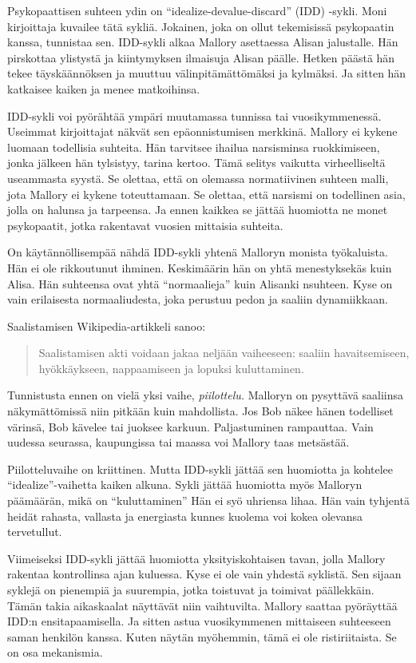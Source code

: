 Psykopaattisen suhteen ydin on ``idealize-devalue-discard'' (IDD) -sykli. Moni kirjoittaja kuvailee tätä sykliä. Jokainen, joka on ollut tekemisissä psykopaatin kanssa, tunnistaa sen. IDD-sykli alkaa Mallory asettaessa Alisan jalustalle. Hän pirskottaa ylistystä ja kiintymyksen ilmaisuja Alisan päälle. Hetken päästä hän tekee täyskäännöksen ja muuttuu välinpitämättömäksi ja kylmäksi. Ja sitten hän katkaisee kaiken ja menee matkoihinsa.

IDD-sykli voi pyörähtää ympäri muutamassa tunnissa tai vuosikymmenessä. Useimmat kirjoittajat näkvät sen epäonnistumisen merkkinä. Mallory ei kykene luomaan todellisia suhteita. Hän tarvitsee ihailua narsisminsa ruokkimiseen, jonka jälkeen hän tylsistyy, tarina kertoo. Tämä selitys vaikutta virheelliseltä useammasta syystä. Se olettaa, että on olemassa normatiivinen suhteen malli, jota Mallory ei kykene toteuttamaan. Se olettaa, että narsismi on todellinen asia, jolla on halunsa ja tarpeensa. Ja ennen kaikkea se jättää huomiotta ne monet psykopaatit, jotka rakentavat vuosien mittaisia suhteita.

On käytännöllisempää nähdä IDD-sykli yhtenä Malloryn monista työkaluista. Hän ei ole rikkoutunut ihminen. Keskimäärin hän on yhtä menestyksekäs kuin Alisa. Hän suhteensa ovat yhtä ``normaalieja'' kuin Alisanki nsuhteen. Kyse on vain erilaisesta normaaliudesta, joka perustuu pedon ja saaliin dynamiikkaan.

Saalistamisen Wikipedia-artikkeli sanoo:
\begin{quotation}
\noindent Saalistamisen akti voidaan jakaa neljään vaiheeseen: saaliin havaitsemiseen, hyökkäykseen, nappaamiseen ja lopuksi kuluttaminen.
\end{quotation}
Tunnistusta ennen on vielä yksi vaihe, \emph{piilottelu.} Malloryn on pysyttävä saaliinsa näkymättömissä niin pitkään kuin mahdollista. Jos Bob näkee hänen todelliset värinsä, Bob kävelee tai juoksee karkuun. Paljastuminen rampauttaa. Vain uudessa seurassa, kaupungissa tai maassa voi Mallory taas metsästää.

Piilotteluvaihe on kriittinen. Mutta IDD-sykli jättää sen huomiotta ja kohtelee ``idealize''-vaihetta kaiken alkuna. Sykli jättää huomiotta myös Malloryn päämäärän, mikä on ``kuluttaminen'' Hän ei syö uhriensa lihaa. Hän vain tyhjentä heidät rahasta, vallasta ja energiasta kunnes kuolema voi kokea olevansa tervetullut.

Viimeiseksi IDD-sykli jättää huomiotta yksityiskohtaisen tavan, jolla Mallory rakentaa kontrollinsa ajan kuluessa. Kyse ei ole vain yhdestä syklistä. Sen sijaan syklejä on pienempiä ja suurempia, jotka toistuvat ja toimivat päällekkäin. Tämän takia aikaskaalat näyttävät niin vaihtuvilta. Mallory saattaa pyöräyttää IDD:n ensitapaamisella. Ja sitten astua vuosikymmenen mittaiseen suhteeseen saman henkilön kanssa. Kuten näytän myöhemmin, tämä ei ole ristiriitaista. Se on osa mekanismia.

